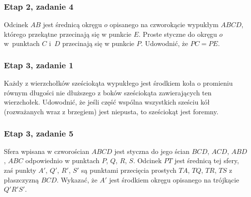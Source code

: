 \subsubsection{Etap 2, zadanie 4}
Odcinek $AB$ jest średnicą okręgu $o$ opisanego na czworokącie wypukłym $ABCD$, którego przekątne przecinają się w punkcie $E$. Proste styczne do okręgu $o$ w~punktach $C$ i~$D$ przecinają się w punkcie $P$.
Udowodnić, że $PC = PE$.

\subsubsection{Etap 3, zadanie 1}
Każdy z wierzchołków sześciokąta wypukłego jest środkiem koła o promieniu równym długości nie dłuższego z boków sześciokąta zawierających ten wierzchołek.
Udowodnić, że jeśli część wspólna wszystkich sześciu kół (rozważanych wraz z brzegiem) jest niepusta, to sześciokąt jest foremny.

\subsubsection{Etap 3, zadanie 5}
Sfera wpisana w czworościan $ABCD$ jest styczna do jego ścian $BCD$, $ACD$, $ABD$, $ABC$ odpowiednio w punktach $P$, $Q$, $R$, $S$.
Odcinek $PT$ jest średnicą tej sfery, zaś punkty $A'$, $Q'$, $R'$, $S'$ są punktami przecięcia prostych $TA$, $TQ$, $TR$, $TS$ z płaszczyzną $BCD$.
Wykazać, że $A'$ jest środkiem okręgu opisanego na trójkącie $Q'R'S'$.

%
